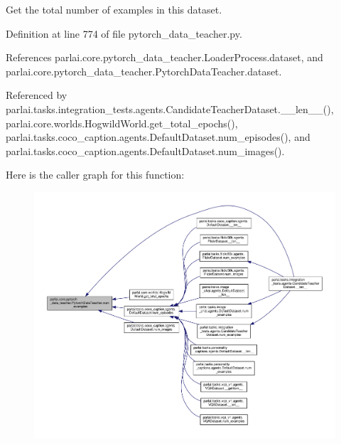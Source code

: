 \begin{DoxyVerb}Get the total number of examples in this dataset.\end{DoxyVerb}
 

Definition at line 774 of file pytorch\+\_\+data\+\_\+teacher.\+py.



References parlai.\+core.\+pytorch\+\_\+data\+\_\+teacher.\+Loader\+Process.\+dataset, and parlai.\+core.\+pytorch\+\_\+data\+\_\+teacher.\+Pytorch\+Data\+Teacher.\+dataset.



Referenced by parlai.\+tasks.\+integration\+\_\+tests.\+agents.\+Candidate\+Teacher\+Dataset.\+\_\+\+\_\+len\+\_\+\+\_\+(), parlai.\+core.\+worlds.\+Hogwild\+World.\+get\+\_\+total\+\_\+epochs(), parlai.\+tasks.\+coco\+\_\+caption.\+agents.\+Default\+Dataset.\+num\+\_\+episodes(), and parlai.\+tasks.\+coco\+\_\+caption.\+agents.\+Default\+Dataset.\+num\+\_\+images().

Here is the caller graph for this function\+:
\nopagebreak
\begin{figure}[H]
\begin{center}
\leavevmode
\includegraphics[width=350pt]{classparlai_1_1core_1_1pytorch__data__teacher_1_1PytorchDataTeacher_a503206272b61d567903ea9bbb70a18c7_icgraph}
\end{center}
\end{figure}
\mbox{\label{classparlai_1_1core_1_1pytorch__data__teacher_1_1PytorchDataTeacher_a568fb8e02997d9662be51a205d0ea886}} 
